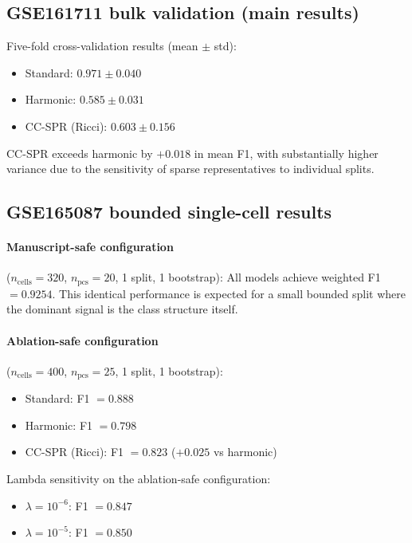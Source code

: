 \documentclass[11pt]{article}
\begin{document}
\subsection{GSE161711 bulk validation (main results)}

Five-fold cross-validation results (mean $\pm$ std):
\begin{itemize}[leftmargin=1.5em]
\item Standard: $0.971 \pm 0.040$
\item Harmonic: $0.585 \pm 0.031$
\item CC-SPR (Ricci): $0.603 \pm 0.156$
\end{itemize}

CC-SPR exceeds harmonic by $+0.018$ in mean F1, with substantially higher variance due to the sensitivity of sparse representatives to individual splits.

\subsection{GSE165087 bounded single-cell results}

\paragraph{Manuscript-safe configuration} ($n_{\text{cells}} = 320$, $n_{\text{pcs}} = 20$, 1 split, 1 bootstrap):
All models achieve weighted F1 $= 0.9254$.
This identical performance is expected for a small bounded split where the dominant signal is the class structure itself.

\paragraph{Ablation-safe configuration} ($n_{\text{cells}} = 400$, $n_{\text{pcs}} = 25$, 1 split, 1 bootstrap):
\begin{itemize}[leftmargin=1.5em]
\item Standard: F1 $= 0.888$
\item Harmonic: F1 $= 0.798$
\item CC-SPR (Ricci): F1 $= 0.823$ ($+0.025$ vs harmonic)
\end{itemize}

Lambda sensitivity on the ablation-safe configuration:
\begin{itemize}[leftmargin=1.5em]
\item $\lambda = 10^{-6}$: F1 $= 0.847$
\item $\lambda = 10^{-5}$: F1 $= 0.850$
\end{itemize}
\end{document}
